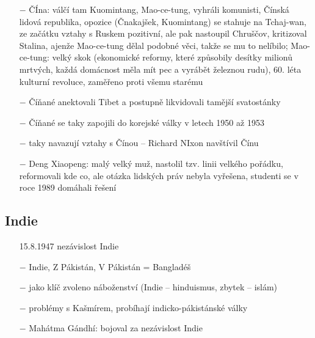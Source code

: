 \documentclass{article}
\begin{document}
\begin{itemize}
    \item[$-$] ČÍna: válčí tam Kuomintang, Mao-ce-tung, vyhráli komunisti, Čínská lidová republika, opozice (Čnakajšek, Kuomintang) se stahuje na Tchaj-wan, ze začátku vztahy s Ruskem pozitivní, ale pak nastoupil Chruščov, kritizoval Stalina, ajenže Mao-ce-tung dělal podobné věci, takže se mu to nelíbilo; Mao-ce-tung: velký skok (ekonomické reformy, které způsobily desítky milionů mrtvých, každá domácnost měla mít pec a vyrábět železnou rudu), 60. léta kulturní revoluce, zaměřeno proti všemu starému
    \item[$-$] Číňané anektovali Tibet a postupně likvidovali tamější svatostánky
    \item[$-$] Číňané se taky zapojili do korejské války v letech 1950 až 1953
    \item[$-$] taky navazují vztahy s Čínou -- Richard NIxon navštívil Čínu
    \item[$-$] Deng Xiaopeng: malý velký muž, nastolil tzv. linii velkého pořádku, reformovali kde co, ale otázka lidských práv nebyla vyřešena, studenti se v roce 1989 domáhali řešení
\end{itemize}

\subsection*{Indie}
\begin{itemize}
    \vspace{-0.5em}
    \setlength\itemsep{0.15em}
    \item[15.8.1947] nezávislost Indie
    \item[$-$] Indie, Z Pákistán, V Pákistán = Bangladéš
    \item[$-$] jako klíč zvoleno náboženství (Indie -- hinduismus, zbytek -- islám)
    \item[$-$] problémy s Kašmírem, probíhají indicko-pákistánské války
    \item[$-$] Mahátma Gándhí: bojoval za nezávislost Indie
\end{itemize}
\end{document}
